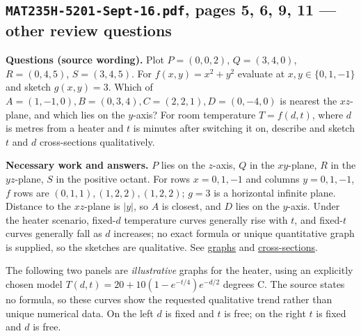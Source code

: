 \subsection{\texttt{MAT235H-5201-Sept-16.pdf}, pages 5, 6, 9, 11 --- other review questions}
\textbf{Questions (source wording).} Plot $P=(0,0,2)$, $Q=(3,4,0)$, $R=(0,4,5)$, $S=(3,4,5)$. For $f(x,y)=x^2+y^2$ evaluate at $x,y\in\{0,1,-1\}$ and sketch $g(x,y)=3$. Which of $A=(1,-1,0), B=(0,3,4), C=(2,2,1), D=(0,-4,0)$ is nearest the $xz$-plane, and which lies on the $y$-axis? For room temperature $T=f(d,t)$, where $d$ is metres from a heater and $t$ is minutes after switching it on, describe and sketch $t$ and $d$ cross-sections qualitatively.\par
\textbf{Necessary work and answers.} $P$ lies on the $z$-axis, $Q$ in the $xy$-plane, $R$ in the $yz$-plane, $S$ in the positive octant. For rows $x=0,1,-1$ and columns $y=0,1,-1$, $f$ rows are $(0,1,1),(1,2,2),(1,2,2)$; $g=3$ is a horizontal infinite plane. Distance to the $xz$-plane is $|y|$, so $A$ is closest, and $D$ lies on the $y$-axis. Under the heater scenario, fixed-$d$ temperature curves generally rise with $t$, and fixed-$t$ curves generally fall as $d$ increases; no exact formula or unique quantitative graph is supplied, so the sketches are qualitative. See \hyperref[graph]{graphs} and \hyperref[cross]{cross-sections}.

The following two panels are \emph{illustrative} graphs for the heater, using an explicitly chosen model $T(d,t)=20+10(1-e^{-t/4})e^{-d/2}$ degrees C. The source states no formula, so these curves show the requested qualitative trend rather than unique numerical data. On the left $d$ is fixed and $t$ is free; on the right $t$ is fixed and $d$ is free.

